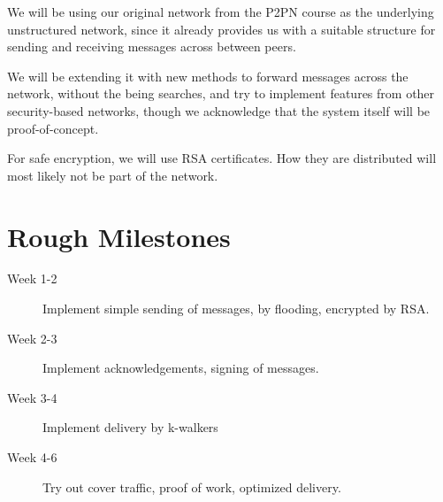 \documentclass{article}
\begin{document}
We will be using our original network from the P2PN course as the underlying unstructured network, since it already provides us with a suitable structure for sending and receiving messages across between peers.

We will be extending it with new methods to forward messages across the network, without the being searches, and try to implement features from other security-based networks, though we acknowledge that the system itself will be proof-of-concept.

For safe encryption, we will use RSA certificates. How they are distributed will most likely not be part of the network.

\section{Rough Milestones}

\begin{description}
\item[Week 1-2] Implement simple sending of messages, by flooding, encrypted by RSA.
\item[Week 2-3] Implement acknowledgements, signing of messages.
\item[Week 3-4] Implement delivery by k-walkers
\item[Week 4-6] Try out cover traffic, proof of work, optimized delivery.
\end{description}
\end{document}

